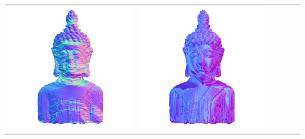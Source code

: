 \begin{center}
\begin{tabularx}{\linewidth}{@{}Y@{}Y@{}Y@{}Y@{}Y@{}Y@{}}
\includegraphics[width=\linewidth]{semisynthetic/20150514_16_yu_out.png} &
\includegraphics[width=\linewidth]{semisynthetic/20150514_16_dpsn_out.png} &

\end{tabularx}
\end{center}
